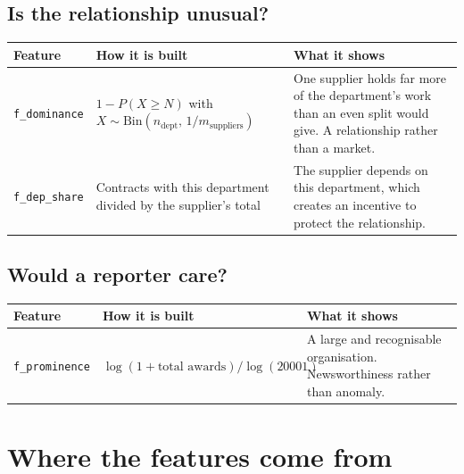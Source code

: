 \documentclass[11pt,a4paper]{article}
\begin{document}
\subsection*{Is the relationship unusual?}

\begin{center}\small
\begin{tabular}{@{}p{2.6cm}p{5.6cm}p{6.7cm}@{}}
\toprule
\textbf{Feature} & \textbf{How it is built} & \textbf{What it shows} \\
\midrule
\texttt{f\_dominance} &
  $1-P(X \ge N)$ with $X \sim \mathrm{Bin}(n_{\text{dept}},\, 1/m_{\text{suppliers}})$ &
  One supplier holds far more of the department's work than an even split would give.
  A relationship rather than a market. \\
\texttt{f\_dep\_share} &
  Contracts with this department divided by the supplier's total &
  The supplier depends on this department, which creates an incentive to protect the
  relationship. \\
\bottomrule
\end{tabular}
\end{center}

\subsection*{Would a reporter care?}

\begin{center}\small
\begin{tabular}{@{}p{2.6cm}p{5.6cm}p{6.7cm}@{}}
\toprule
\textbf{Feature} & \textbf{How it is built} & \textbf{What it shows} \\
\midrule
\texttt{f\_prominence} &
  $\log(1+\text{total awards})/\log(20001)$ &
  A large and recognisable organisation. Newsworthiness rather than anomaly. \\
\bottomrule
\end{tabular}
\end{center}

\section*{Where the features come from}
\end{document}
